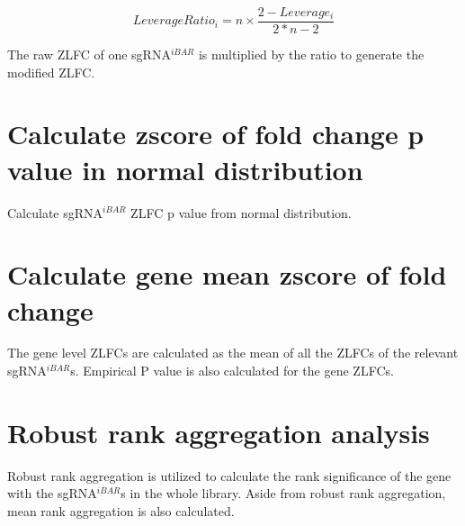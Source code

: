 \documentclass[11pt, a4paper]{article}
\begin{document}
$$Leverage Ratio_{i} = n \times \frac{2 - Leverage_{i}}{2 * n - 2}$$

The raw ZLFC of one sgRNA$^{iBAR}$ is multiplied by the ratio to generate
the modified ZLFC.


\section{Calculate zscore of fold change p value in normal distribution}

Calculate sgRNA$^{iBAR}$ ZLFC p value from normal distribution.


\section{Calculate gene mean zscore of fold change}

The gene level ZLFCs are calculated as the mean of all the ZLFCs of
the relevant sgRNA$^{iBAR}$s. Empirical P value is also calculated for the
gene ZLFCs.

\section{Robust rank aggregation analysis}


Robust rank aggregation \citep{kolde_robust_2012} is utilized to
calculate the rank significance of the gene with the sgRNA$^{iBAR}$s
in the whole library. Aside from robust rank aggregation, mean rank
aggregation is also calculated.


\end{document}
